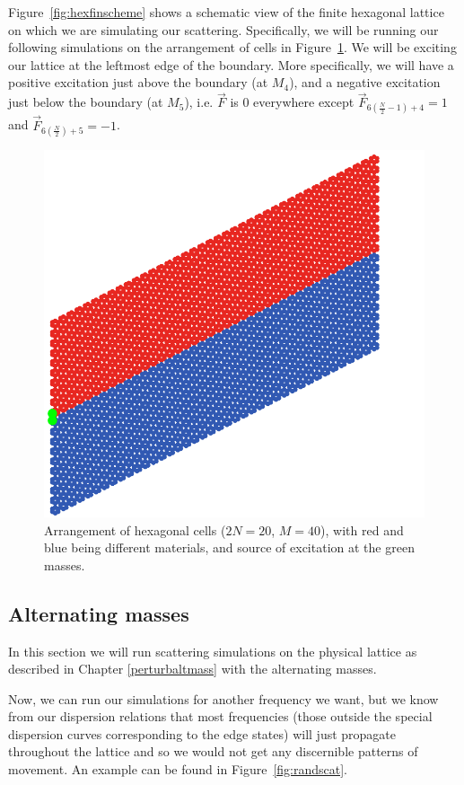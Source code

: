 Figure~\ref{fig:hexfinscheme} shows a schematic view of the finite hexagonal
lattice on which we are simulating our scattering. Specifically, we will be
running our following simulations on the arrangement of cells in
Figure~\ref{fig:hexstdfinlattice}. We will be exciting our lattice at the
leftmost edge of the boundary. More specifically, we will have a positive
excitation just above the boundary (at $M_4$), and a negative excitation just
below the boundary (at $M_5$), i.e. $\vec{F}$ is $0$ everywhere except
$\vec{F}_{6(\frac{N}{2}-1)+4}=1$ and $\vec{F}_{6(\frac{N}{2})+5}=-1$.

\begin{figure}
  \centering
  \includegraphics[width=0.5\linewidth]{imgs/hexstdfinlattice.png}
  \caption{Arrangement of hexagonal cells ($2N=20$, $M=40$), with red and blue
    being different materials, and source of excitation at the green masses.}
  \label{fig:hexstdfinlattice}
\end{figure}

\subsection{Alternating masses}

In this section we will run scattering simulations on the physical lattice as
described in Chapter \ref{perturbaltmass} with the alternating masses.

Now, we can run our simulations for another frequency we want, but we know from
our dispersion relations that most frequencies (those outside the special
dispersion curves corresponding to the edge states) will just propagate
throughout the lattice and so we would not get any discernible patterns of
movement. An example can be found in Figure~\ref{fig:randscat}.

